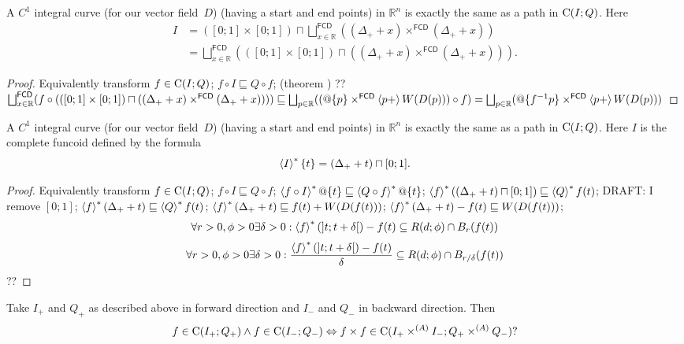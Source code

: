 \begin{thm}
A $C^1$ integral curve (for our vector field~$D$) (having a start and end points) in $\mathbb{R}^n$ is exactly the same as a path in $\mathrm{C}(I;Q)$.
Here
\begin{align*}
I &= ([0;1]\times[0;1]) \sqcap \bigsqcup^{\mathsf{FCD}}_{x\in\mathbb{R}} ((\Delta_{+}+x)\times^{\mathsf{FCD}}(\Delta_{+}+x)) \\
  &= \bigsqcup^{\mathsf{FCD}}_{x\in\mathbb{R}} (([0;1]\times[0;1])\sqcap((\Delta_{+}+x)\times^{\mathsf{FCD}}(\Delta_{+}+x))) .
\end{align*}
\end{thm}

\begin{proof}
Equivalently transform $f\in\mathrm{C}(I;Q)$; $f\circ I\sqsubseteq Q\circ f$; (theorem )
??
$\bigsqcup^{\mathsf{FCD}}_{x\in\mathbb{R}} (f\circ (([0;1]\times[0;1])\sqcap((\Delta_{+}+x)\times^{\mathsf{FCD}}(\Delta_{+}+x))) ) \sqsubseteq
\bigsqcup_{p\in\mathbb{R}} ((@\{p\}\times^{\mathsf{FCD}}\left\langle p+\right\rangle{W(D(p))}) \circ f) =
\bigsqcup_{p\in\mathbb{R}} (@\{f^{-1}p\}\times^{\mathsf{FCD}}\left\langle p+\right\rangle{W(D(p))})
$
\end{proof}

\begin{thm}
A $C^1$ integral curve (for our vector field~$D$) (having a start and end points) in $\mathbb{R}^n$ is exactly the same as a path in $\mathrm{C}(I;Q)$.
Here $I$ is the complete funcoid defined by the formula
\[ \left\langle I\right\rangle ^{\ast}\{t\} = (\Delta_{+} + t)\sqcap[0;1]. \]
\end{thm}

\begin{proof}
Equivalently transform $f\in\mathrm{C}(I;Q)$; $f\circ I\sqsubseteq Q\circ f$;
$\left\langle f\circ I\right\rangle ^{\ast}@\{t\}\sqsubseteq \left\langle Q\circ f\right\rangle ^{\ast}@\{t\}$;
$\left\langle f\right\rangle ^{\ast}((\Delta_{+} + t)\sqcap[0;1])\sqsubseteq \left\langle Q\right\rangle ^{\ast}f(t)$;
DRAFT: I remove $[0;1]$; $\left\langle f\right\rangle ^{\ast}(\Delta_{+} + t)\sqsubseteq \left\langle Q\right\rangle ^{\ast}f(t)$;
$\left\langle f\right\rangle ^{\ast}(\Delta_{+} + t)\sqsubseteq f(t)+W(D(f(t)))$;
$\left\langle f\right\rangle ^{\ast}(\Delta_{+} + t)-f(t)\sqsubseteq W(D(f(t)))$;
\[ \forall r>0, \phi>0 \exists\delta>0: \left\langle f\right\rangle ^{\ast}(]t;t+\delta[)-f(t)\subseteq R(d;\phi) \cap B_r(f(t)) \]
\[ \forall r>0, \phi>0 \exists\delta>0: \frac{\left\langle f\right\rangle ^{\ast}(]t;t+\delta[)-f(t)}{\delta}\subseteq R(d;\phi) \cap B_{r/\delta}(f(t)) \]
??
\end{proof}


Take $I_+$ and $Q_+$ as described above in forward direction and $I_-$ and $Q_-$ in backward direction. Then
\[ f\in\mathrm{C}(I_+;Q_+)\land f\in\mathrm{C}(I_-;Q_-) \Leftrightarrow f\times f\in\mathrm{C}(I_+\times^{(A)}I_-;Q_+\times^{(A)}Q_-)? \]

